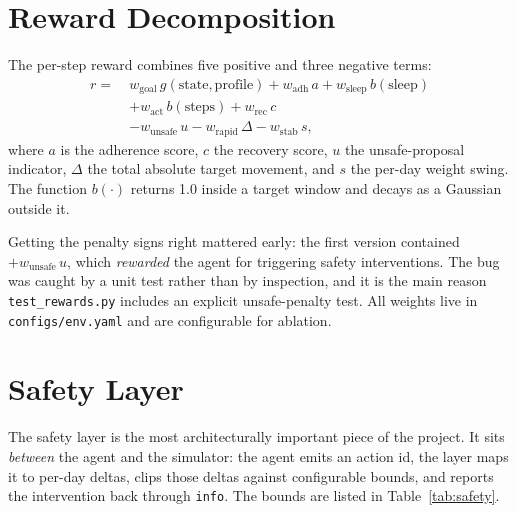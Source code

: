 \documentclass[conference]{IEEEtran}
\newcommand{\code}[1]{\texttt{\small #1}}
\begin{document}
\section{Reward Decomposition}
\label{sec:reward}
The per-step reward combines five positive and three negative terms:
\begin{align}
r =\ & w_{\text{goal}}\, g(\text{state},\text{profile})
      + w_{\text{adh}}\, a
      + w_{\text{sleep}}\, b(\text{sleep}) \nonumber\\
   & + w_{\text{act}}\, b(\text{steps})
      + w_{\text{rec}}\, c \nonumber\\
   & - w_{\text{unsafe}}\, u
      - w_{\text{rapid}}\, \Delta
      - w_{\text{stab}}\, s,
\end{align}
where $a$ is the adherence score, $c$ the recovery score, $u$ the unsafe-proposal
indicator, $\Delta$ the total absolute target movement, and $s$ the per-day
weight swing. The function $b(\cdot)$ returns 1.0 inside a target window and
decays as a Gaussian outside it.

Getting the penalty signs right mattered early: the first version contained
$+w_{\text{unsafe}}\,u$, which \emph{rewarded} the agent for triggering safety
interventions. The bug was caught by a unit test rather than by inspection, and
it is the main reason \code{test\_rewards.py} includes an explicit
unsafe-penalty test. All weights live in \code{configs/env.yaml} and are
configurable for ablation.

\section{Safety Layer}
The safety layer is the most architecturally important piece of the project. It
sits \emph{between} the agent and the simulator: the agent emits an action id,
the layer maps it to per-day deltas, clips those deltas against configurable
bounds, and reports the intervention back through \code{info}. The bounds are
listed in Table~\ref{tab:safety}.
\end{document}
